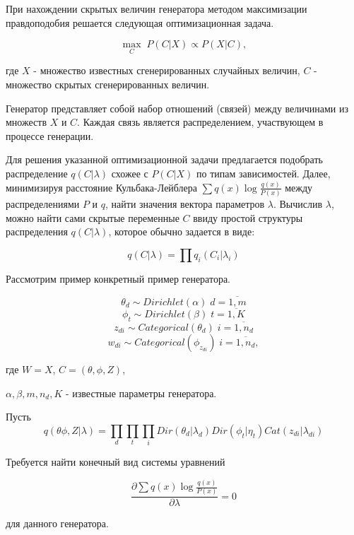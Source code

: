 \begin{problem}
При нахождении скрытых величин генератора методом максимизации правдоподобия решается следующая оптимизационная задача.

\[
\underset{C}{\max} \; P(C \vert X) \varpropto P(X \vert C),
\]

где $X$ - множество известных сгенерированных случайных величин, $C$ - множество скрытых  сгенерированных величин.

Генератор представляет собой набор отношений (связей) между величинами из множеств $X$ и $C$. 
Каждая связь является распределением, участвующем в процессе генерации. 

Для решения указанной оптимизационной задачи предлагается подобрать распределение $q(C \vert \lambda)$ схожее с $P(C \vert X)$ по типам зависимостей. Далее, минимизируя расстояние Кульбака-Лейблера $\sum q\left(x\right)\log \frac{q\left(x\right)}{P\left(x\right)}  $ между распределениями $P$ и $q$, найти значения вектора параметров $\lambda$. Вычислив $\lambda$, можно найти сами скрытые переменные $C$ ввиду простой структуры распределения $q(C \vert \lambda)$, которое обычно задается в виде:

\[
q(C \vert \lambda) = \prod q_i(C_i \vert \lambda_i) 
\]        

Рассмотрим пример конкретный пример генератора.

\[
\theta_d \sim Dirichlet(\alpha) \; d = \overline{1,m}
\]
\[
\phi_t \sim Dirichlet(\beta) \; t = \overline{1,K}
\]
\[
z_{di} \sim Categorical(\theta_d) \; i = \overline{1,n_d}
\]
\[
w_{di} \sim Categorical(\phi_{z_{di}}) \; i = \overline{1,n_d},
\]
 
где $W = X$, $C = (\theta, \phi, Z)$, 

$\alpha, \beta, m, n_d, K$ - известные параметры генератора.  

Пусть 
\[
q(\theta \phi, Z \vert \lambda) = \underset{d}{\prod}\underset{t}{\prod}\underset{i}{\prod} Dir(\theta_d | \lambda_{d}) Dir(\phi_t | \eta_{t}) Cat(z_{di} | \lambda_{di})
\]

Требуется найти конечный вид системы уравнений 

\[
\frac{\partial \sum q\left(x\right)\log \frac{q\left(x\right)}{P\left(x\right)} } {\partial \lambda} = 0
\]  

для данного генератора.

\end{problem}

